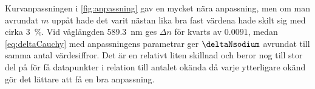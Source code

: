 \documentclass[a4paper]{article}
\begin{document}
Kurvanpassningen i \autoref{fig:anpassning} gav en mycket nära anpassning, men om man avrundat $m$ uppåt hade det varit nästan lika bra fast värdena hade skilt sig med cirka \SI{3}{\percent}. Vid våglängden \SI{589.3}{\nano\meter} ges $\Delta n$ för kvarts av $0.0091$\cite[p.~383]{pearsonIntroOpt}, medan \eqref{eq:deltaCauchy} med anpassningens parametrar ger $\deltaNsodium$ avrundat till samma antal värdesiffror. Det är en relativt liten skillnad och beror nog till stor del på för få datapunkter i relation till antalet okända då varje ytterligare okänd gör det lättare att få en bra anpassning.



 
 {}
 
\end{document}
